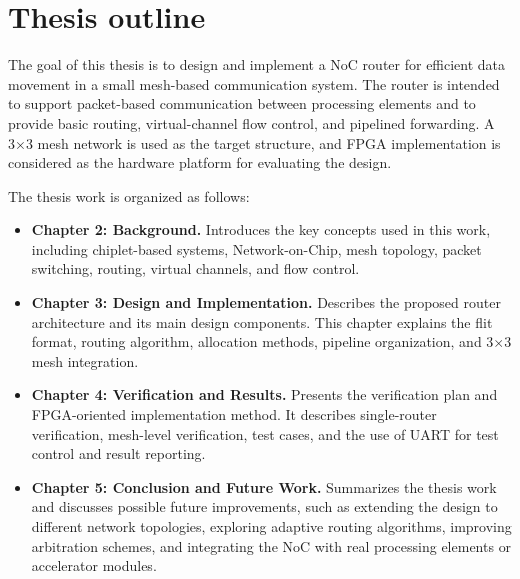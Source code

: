 \section{Thesis outline}
The goal of this thesis is to design and implement a NoC router for efficient data movement in a small mesh-based communication system. The router is intended to support packet-based communication between processing elements and to provide basic routing, virtual-channel flow control, and pipelined forwarding. A 3×3 mesh network is used as the target structure, and FPGA implementation is considered as the hardware platform for evaluating the design.

The thesis work is organized as follows:

\begin{itemize}
    \item \textbf{Chapter 2: Background.} 
    Introduces the key concepts used in this work, including chiplet-based systems, 
    Network-on-Chip, mesh topology, packet switching, routing, virtual channels, 
    and flow control.

    \item \textbf{Chapter 3: Design and Implementation.} 
    Describes the proposed router architecture and its main design components. 
    This chapter explains the flit format, routing algorithm, allocation methods, 
    pipeline organization, and 3$\times$3 mesh integration.

    \item \textbf{Chapter 4: Verification and Results.} 
    Presents the verification plan and FPGA-oriented implementation method. 
    It describes single-router verification, mesh-level verification, test cases, 
    and the use of UART for test control and result reporting.

    \item \textbf{Chapter 5: Conclusion and Future Work.} 
    Summarizes the thesis work and discusses possible future improvements, such as 
    extending the design to different network topologies, exploring adaptive routing 
    algorithms, improving arbitration schemes, and integrating the NoC with real 
    processing elements or accelerator modules.
\end{itemize}